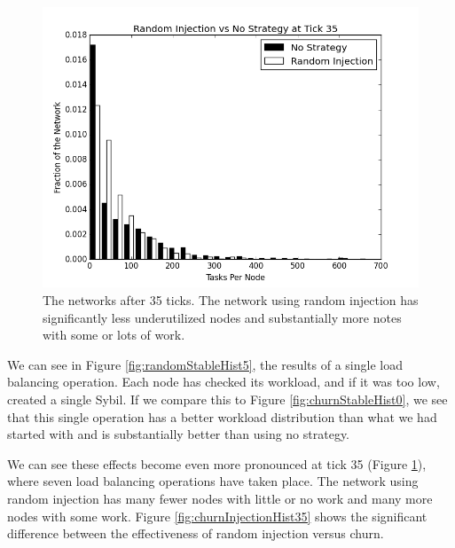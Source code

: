 \documentclass[10pt,conference]{IEEEtran}
\begin{document}
	
	\begin{figure}
		\centering
		\includegraphics[width=0.9\linewidth]{figs/randomStableHist35}
		\caption[Random injection vs no strategy after 35 ticks.]{The networks after 35 ticks.  The network using random injection has significantly less underutilized nodes and substantially more notes with some or lots of work.}
		\label{fig:randomStableHist35}
	\end{figure}
	
	
	We can see in Figure \ref{fig:randomStableHist5}, the results of a single load balancing operation.
	Each node has checked its workload, and if it was too low, created a single Sybil.
	If we compare this to Figure \ref{fig:churnStableHist0}, we see that this single operation has a better workload distribution than what we had started with and is substantially better than using no strategy.
	
	We can see these effects become even more pronounced at tick 35 (Figure \ref{fig:randomStableHist35}), where seven load balancing operations have taken place.
	The network using random injection has many fewer nodes with little or no work and many more nodes with some work.
	Figure \ref{fig:churnInjectionHist35} shows the significant difference between the effectiveness of random injection versus churn.
	
\end{document}
